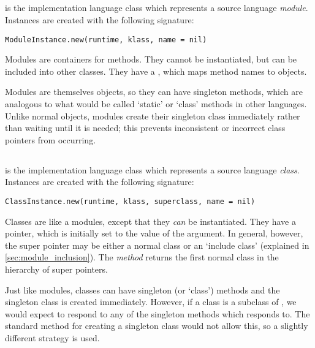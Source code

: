 \subsection{}

 is the implementation language class which represents a source language \textit{module}. Instances are created with the following signature:

\begin{lstlisting}
ModuleInstance.new(runtime, klass, name = nil)
\end{lstlisting}

Modules are containers for methods. They cannot be instantiated, but can be included into other classes. They have a , which maps method names to  objects.

Modules are themselves objects, so they can have singleton methods, which are analogous to what would be called `static' or `class' methods in other languages. Unlike normal objects, modules create their singleton class immediately rather than waiting until it is needed; this prevents inconsistent or incorrect class pointers from occurring.

\subsection{}

 is the implementation language class which represents a source language \textit{class}. Instances are created with the following signature:

\begin{lstlisting}
ClassInstance.new(runtime, klass, superclass, name = nil)
\end{lstlisting}

Classes are like a modules, except that they \textit{can} be instantiated. They have a  pointer, which is initially set to the value of the  argument. In general, however, the super pointer may be either a normal class or an `include class' (explained in \autoref{sec:module_inclusion}). The  \textit{method} returns the first normal class in the hierarchy of super pointers.

Just like modules, classes can have singleton (or `class') methods and the singleton class is created immediately. However, if a class  is a subclass of , we would expect  to respond to any of the singleton methods which  responds to. The standard method for creating a singleton class would not allow this, so a slightly different strategy is used.

